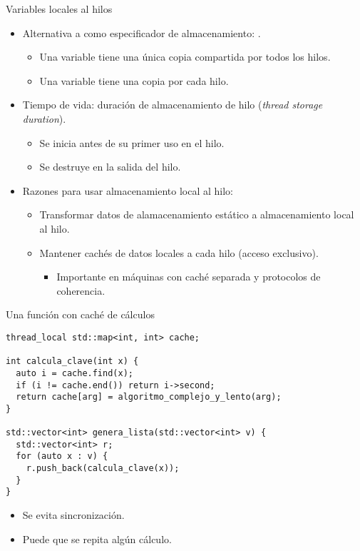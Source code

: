 \begin{frame}{Variables locales al hilos}
\begin{itemize}
  \item Alternativa a  como especificador de almacenamiento: .
    \begin{itemize}
      \item Una variable  tiene una única copia compartida por todos los hilos.
      \item Una variable  tiene una copia por cada hilo.
    \end{itemize}
  \item Tiempo de vida: duración de almacenamiento de hilo (\emph{thread storage duration}).
    \begin{itemize}
      \item Se inicia antes de su primer uso en el hilo.
      \item Se destruye en la salida del hilo.
    \end{itemize}
  \item Razones para usar almacenamiento local al hilo:
    \begin{itemize}
      \item Transformar datos de alamacenamiento estático a almacenamiento local al hilo.
      \item Mantener cachés de datos locales a cada hilo (acceso exclusivo).
        \begin{itemize}
          \item Importante en máquinas con caché separada y protocolos de coherencia.
        \end{itemize}
    \end{itemize}
\end{itemize}
\end{frame}

\begin{frame}[fragile]
\begin{block}{Una función con caché de cálculos}
\begin{lstlisting}
thread_local std::map<int, int> cache;

int calcula_clave(int x) {
  auto i = cache.find(x);
  if (i != cache.end()) return i->second;
  return cache[arg] = algoritmo_complejo_y_lento(arg);
}

std::vector<int> genera_lista(std::vector<int> v) {
  std::vector<int> r;
  for (auto x : v) {
    r.push_back(calcula_clave(x));
  }
}
\end{lstlisting}
\end{block}
\begin{itemize}
  \item Se evita sincronización.
  \item Puede que se repita algún cálculo.
\end{itemize}
\end{frame}
